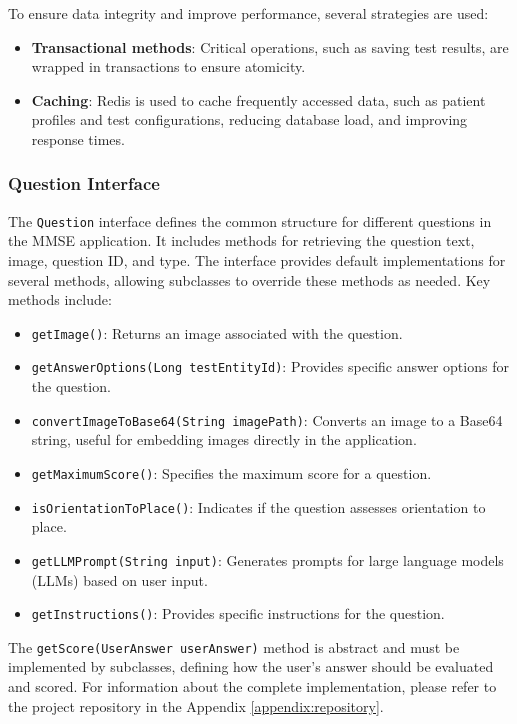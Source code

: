 To ensure data integrity and improve performance, several strategies are used:
\begin{itemize}
    \item \textbf{Transactional methods}: Critical operations, such as saving test results, are wrapped in transactions to ensure atomicity.
    \item \textbf{Caching}: Redis is used to cache frequently accessed data, such as patient profiles and test configurations, reducing database load, and improving response times.
\end{itemize}

\subsubsection{Question Interface}
The \texttt{Question} interface defines the common structure for different questions in the MMSE application. It includes methods for retrieving the question text, image, question ID, and type. The interface provides default implementations for several methods, allowing subclasses to override these methods as needed. Key methods include:
\begin{itemize}
    \item \texttt{getImage()}: Returns an image associated with the question.
    \item \texttt{getAnswerOptions(Long testEntityId)}: Provides specific answer options for the question.
    \item \texttt{convertImageToBase64(String imagePath)}: Converts an image to a Base64 string, useful for embedding images directly in the application.
    \item \texttt{getMaximumScore()}: Specifies the maximum score for a question.
    \item \texttt{isOrientationToPlace()}: Indicates if the question assesses orientation to place.
    \item \texttt{getLLMPrompt(String input)}: Generates prompts for large language models (LLMs) based on user input.
    \item \texttt{getInstructions()}: Provides specific instructions for the question.
\end{itemize}

The \texttt{getScore(UserAnswer userAnswer)} method is abstract and must be implemented by subclasses, defining how the user’s answer should be evaluated and scored. For information about the complete implementation, please refer to the project repository in the Appendix \ref{appendix:repository}.

